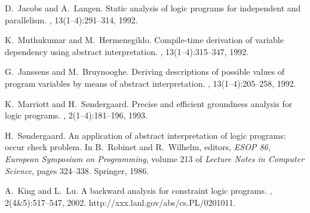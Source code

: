 \documentclass{llncs}
\begin{document}
\begin{thebibliography}{10}
D.~Jacobs and A.~Langen.
\newblock Static analysis of logic programs for independent and parallelism.
, 13(1--4):291--314, 1992.

K.~Muthukumar and M.~Hermenegildo.
\newblock Compile-time derivation of variable dependency using abstract
  interpretation.
, 13(1--4):315--347, 1992.


G.~Janssens and M.~Bruynooghe.
\newblock Deriving descriptions of possible values of program variables by
  means of abstract interpretation.
, 13(1--4):205--258, 1992.

K.~Marriott and H.~S{\o}ndergaard.
\newblock Precise and efficient groundness analysis for logic programs.
,
  2(1--4):181--196, 1993.

H.~S{\o}ndergaard.
\newblock An application of abstract interpretation of logic programs: occur
  check problem.
\newblock In B.~Robinet and R.~Wilhelm, editors, {\em ESOP 86, European
  Symposium on Programming}, volume 213 of {\em Lecture Notes in Computer
  Science}, pages 324--338. Springer, 1986.

A.~King and L.~Lu.
\newblock A backward analysis for constraint logic programs.
, 2(4\&5):517--547,
  2002.
\newblock http://xxx.lanl.gov/abs/cs.PL/0201011.


\end{thebibliography}
\end{document}
